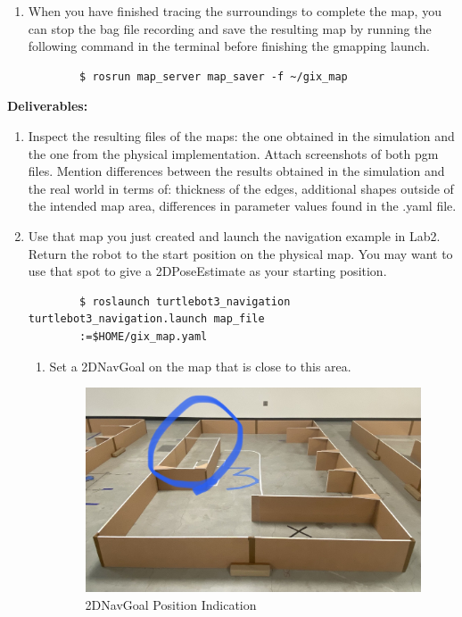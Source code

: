 \documentclass[12pt]{article}
\begin{document}
\begin{enumerate}
    \item When you have finished tracing the surroundings to complete the map, you can stop the bag file recording and save the resulting map by running the following command in the terminal before finishing the gmapping launch.
    \begin{verbatim}
        $ rosrun map_server map_saver -f ~/gix_map
    \end{verbatim}
    
    
\end{enumerate}

\textbf{Deliverables:}
\begin{enumerate}
    \item Inspect the resulting files of the maps: the one obtained in the simulation and the one from the physical implementation. Attach screenshots of both pgm files. Mention differences between the results obtained in the simulation and the real world in terms of: thickness of the edges, additional shapes outside of the intended map area, differences in parameter values found in the .yaml file.
    
    \item Use that map you just created and launch the navigation example in Lab2. Return the robot to the start position on the physical map. You may want to use that spot to give a 2DPoseEstimate as your starting position.
    \begin{verbatim}
        $ roslaunch turtlebot3_navigation turtlebot3_navigation.launch map_file
        :=$HOME/gix_map.yaml
    \end{verbatim}
    \begin{enumerate}
        \item Set a 2DNavGoal on the map that is close to this area.
        \begin{figure}[H]
        \vspace{-10pt}
        \centering\includegraphics[width=14cm]{images/map2.jpeg}\vspace{-10pt}
        \caption{2DNavGoal Position Indication}
        \end{figure}
        

\end{enumerate}
\end{enumerate}
\end{document}

